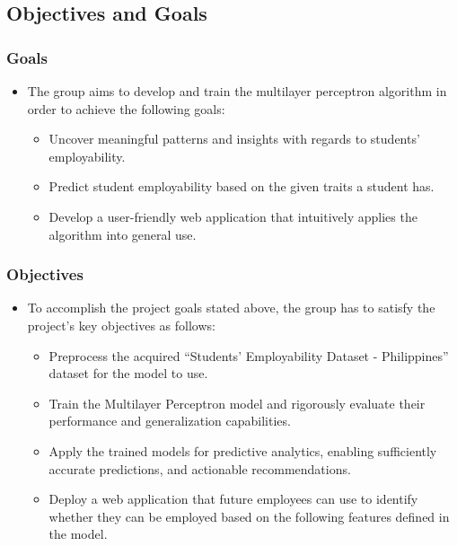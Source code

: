 \subsection{Objectives and Goals}
\begin{frame}
\frametitle{Goals}
	\begin{itemize}
		\item The group aims to develop and train the multilayer perceptron algorithm in order to achieve the following goals:
			\begin{itemize}
				\item Uncover meaningful patterns and insights with regards to students' employability.
				\item Predict student employability based on the given traits a student has.
				\item Develop a user-friendly web application that intuitively applies the algorithm into general use.
			\end{itemize}
	\end{itemize}
\end{frame}

\begin{frame}
\frametitle{Objectives}
	\begin{itemize}
		\item To accomplish the project goals stated above, the group has to satisfy the project's key objectives as follows:
			\begin{itemize}
				\item Preprocess the acquired ``Students' Employability Dataset - Philippines'' dataset for the model to use.
				\item Train the Multilayer Perceptron model and rigorously evaluate their performance and generalization capabilities.
				\item Apply the trained models for predictive analytics, enabling sufficiently accurate predictions, and actionable recommendations.
				\item Deploy a web application that future employees can use to identify whether they can be employed based on the following features defined in the model.
			\end{itemize}
	\end{itemize}
\end{frame}
